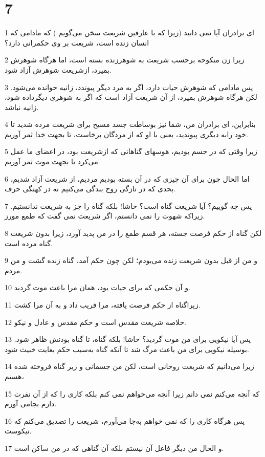 \chapter{7}

\par 1 ای برادران آیا نمی دانید (زیرا که با عارفین شریعت سخن می‌گویم ) که مادامی که انسان زنده است، شریعت بر وی حکمرانی دارد؟
\par 2 زیرا زن منکوحه برحسب شریعت به شوهرزنده بسته است، اما هرگاه شوهرش بمیرد، ازشریعت شوهرش آزاد شود.
\par 3 پس مادامی که شوهرش حیات دارد، اگر به مرد دیگر پیوندد، زانیه خوانده می‌شود. لکن هرگاه شوهرش بمیرد، از آن شریعت آزاد است که اگر به شوهری دیگرداده شود، زانیه نباشد.
\par 4 بنابراین، ای برادران من، شما نیز بوساطت جسد مسیح برای شریعت مرده شدید تا خود رابه دیگری پیوندید، یعنی با او که از مردگان برخاست، تا بجهت خدا ثمر آوریم.
\par 5 زیرا وقتی که در جسم بودیم، هوسهای گناهانی که ازشریعت بود، در اعضای ما عمل می‌کرد تا بجهت موت ثمر آوریم.
\par 6 اما الحال چون برای آن چیزی که در آن بسته بودیم مردیم، از شریعت آزاد شدیم، بحدی که در تازگی روح بندگی می‌کنیم نه در کهنگی حرف.
\par 7 پس چه گوییم؟ آیا شریعت گناه است؟ حاشا! بلکه گناه را جز به شریعت ندانستیم. زیراکه شهوت را نمی دانستم، اگر شریعت نمی گفت که طمع مورز.
\par 8 لکن گناه از حکم فرصت جسته، هر قسم طمع را در من پدید آورد، زیرا بدون شریعت گناه مرده است.
\par 9 و من از قبل بدون شریعت زنده می‌بودم؛ لکن چون حکم آمد، گناه زنده گشت و من مردم.
\par 10 و آن حکمی که برای حیات بود، همان مرا باعث موت گردید.
\par 11 زیراگناه از حکم فرصت یافته، مرا فریب داد و به آن مرا کشت.
\par 12 خلاصه شریعت مقدس است و حکم مقدس و عادل و نیکو.
\par 13 پس آیا نیکویی برای من موت گردید؟ حاشا! بلکه گناه، تا گناه بودنش ظاهر شود. بوسیله نیکویی برای من باعث مرگ شد تا آنکه گناه به‌سبب حکم بغایت خبیث شود.
\par 14 زیرا می‌دانیم که شریعت روحانی است، لکن من جسمانی و زیر گناه فروخته شده هستم،
\par 15 که آنچه می‌کنم نمی دانم زیرا آنچه می‌خواهم نمی کنم بلکه کاری را که از آن نفرت دارم بجامی آورم.
\par 16 پس هرگاه کاری را که نمی خواهم به‌جا می‌آورم، شریعت را تصدیق می‌کنم که نیکوست.
\par 17 و الحال من دیگر فاعل آن نیستم بلکه آن گناهی که در من ساکن است.
